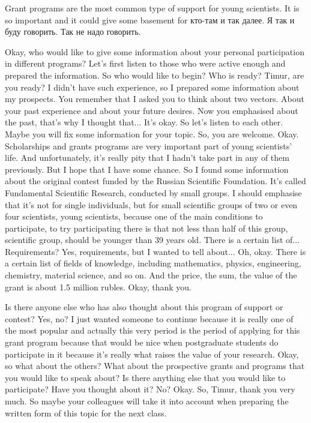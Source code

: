 \documentclass[main.tex]{subfiles}
\begin{document}
Grant programs are the most common type of support for young scientists.
It is so important and it could give some basement for кто-там и так далее.
Я так и буду говорить.
Так не надо говорить.

Okay, who would like to give some information about your personal participation in different programs?
Let's first listen to those who were active enough and prepared the information.
So who would like to begin?
Who is ready?
Timur, are you ready?
I didn't have such experience, so I prepared some information about my prospects.
You remember that I asked you to think about two vectors.
About your past experience and about your future desires.
Now you emphasised about the past, that's why I thought that...
It's okay.
So let's listen to each other.
Maybe you will fix some information for your topic.
So, you are welcome.
Okay.
Scholarships and grants programs are very important part of young scientists' life.
And unfortunately, it's really pity that I hadn't take part in any of them previously.
But I hope that I have some chance.
So I found some information about the original contest funded by the Russian Scientific Foundation.
It's called Fundamental Scientific Research, conducted by small groups.
I should emphasise that it's not for single individuals, but for small scientific groups of two or even four scientists, young scientists, because one of the main conditions to participate, to try participating there is that not less than half of this group, scientific group, should be younger than 39 years old.
There is a certain list of...
Requirements?
Yes, requirements, but I wanted to tell about...
Oh, okay.
There is a certain list of fields of knowledge, including mathematics, physics, engineering, chemistry, material science, and so on.
And the price, the sum, the value of the grant is about 1.5 million rubles.
Okay, thank you.

Is there anyone else who has also thought about this program of support or contest?
Yes, no?
I just wanted someone to continue because it is really one of the most popular and actually this very period is the period of applying for this grant program because that would be nice when postgraduate students do participate in it because it's really what raises the value of your research.
Okay, so what about the others?
What about the prospective grants and programs that you would like to speak about?
Is there anything else that you would like to participate?
Have you thought about it?
No?
Okay.
So, Timur, thank you very much.
So maybe your colleagues will take it into account when preparing the written form of this topic for the next class.
\end{document}
